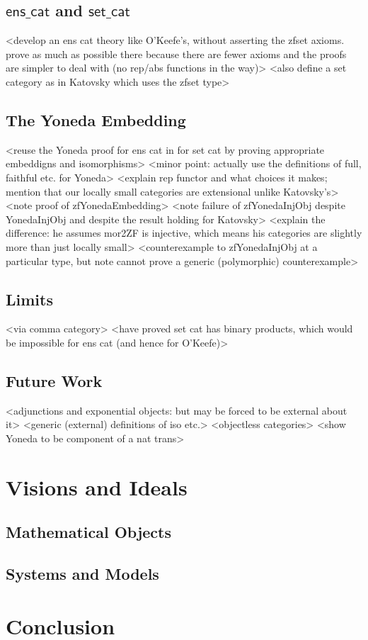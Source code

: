 \documentclass{article}
\begin{document}
\subsection{$\mathsf{ens\_cat}$ and $\mathsf{set\_cat}$}
<develop an ens cat theory like O'Keefe's, without asserting the zfset axioms. prove as much as possible there because there are fewer axioms and the proofs are simpler to deal with (no rep/abs functions in the way)>
<also define a set category as in Katovsky which uses the zfset type>
\subsection{The Yoneda Embedding}
<reuse the Yoneda proof for ens cat in for set cat by proving appropriate embeddigns and isomorphisms>
<minor point: actually use the definitions of full, faithful etc. for Yoneda>
<explain rep functor and what choices it makes; mention that our locally small categories are extensional unlike Katovsky's>
<note proof of zfYonedaEmbedding>
<note failure of zfYonedaInjObj despite YonedaInjObj and despite the result holding for Katovsky>
<explain the difference: he assumes mor2ZF is injective, which means his categories are slightly more than just locally small>
<counterexample to zfYonedaInjObj at a particular type, but note cannot prove a generic (polymorphic) counterexample>
\subsection{Limits}
<via comma category>
<have proved set cat has binary products, which would be impossible for ens cat (and hence for O'Keefe)>
\subsection{Future Work}
<adjunctions and exponential objects: but may be forced to be external about it>
<generic (external) definitions of iso etc.>
<objectless categories>
<show Yoneda to be component of a nat trans>
\section{Visions and Ideals}
\subsection{Mathematical Objects}
\subsection{Systems and Models}
\section{Conclusion}


\end{document}
